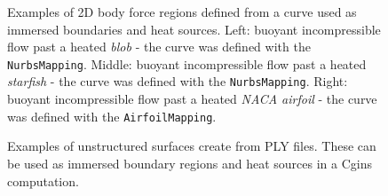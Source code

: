 \begin{figure}[hbt]
\newcommand{\figWidth}{5.5cm}
\newcommand{\trimfig}[2]{\trimFigb{#1}{#2}{0.0}{.0}{.0}{.0}}
\begin{center}
\end{center}
\caption{Examples of 2D body force regions defined from a curve used as immersed boundaries and heat sources. 
Left: buoyant incompressible flow past a heated {\em blob} - the curve was defined with the {\tt NurbsMapping}.
Middle: buoyant incompressible flow past a heated {\em starfish} - the curve was defined with the {\tt NurbsMapping}.
Right: buoyant incompressible flow past a heated {\em NACA airfoil} - the curve was defined with the {\tt AirfoilMapping}.
}
\label{fig:bodyForceRegions2D}
\end{figure}

\begin{figure}[hbt]
\newcommand{\figWidth}{5.5cm}
\newcommand{\trimfig}[2]{\trimFigb{#1}{#2}{0.0}{.0}{.0}{.0}}
\begin{center}
\end{center}
\caption{Examples of unstructured surfaces create from PLY files. These can be used as immersed boundary regions and heat
sources in a Cgins computation.}
\label{fig:bodyForceRegionsPLY}
\end{figure}


